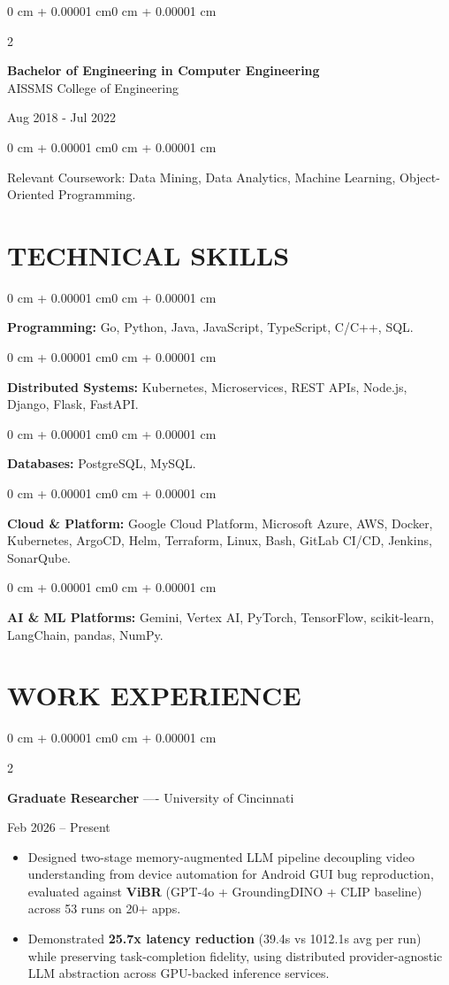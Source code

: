 \documentclass[10pt, letterpaper]{article}
\newenvironment{highlights}{
    \begin{itemize}[
        topsep=0.10 cm,
        parsep=0.06 cm,
        partopsep=0pt,
        itemsep=0.06 cm,
        leftmargin=12pt
    ]
}{
    \end{itemize}
}
\newenvironment{onecolentry}{
    \begin{adjustwidth}{0 cm + 0.00001 cm}{0 cm + 0.00001 cm}
}{
    \end{adjustwidth}
}
\newenvironment{twocolentry}[2][]{
    \onecolentry
    \def\secondColumn{#2}
    \setcolumnwidth{\fill, 4.5 cm}
    \begin{paracol}{2}
}{
    \switchcolumn \raggedleft \secondColumn
    \end{paracol}
    \endonecolentry
}
\begin{document}
\begin{twocolentry}{
    Aug 2018 - Jul 2022
}
    \textbf{Bachelor of Engineering in Computer Engineering} \\
    AISSMS College of Engineering
\end{twocolentry}
\begin{onecolentry}
Relevant Coursework: Data Mining, Data Analytics, Machine Learning, Object-Oriented Programming.
\end{onecolentry}
\section{TECHNICAL SKILLS}
\begin{onecolentry}
\textbf{Programming:} Go, Python, Java, JavaScript, TypeScript, C/C++, SQL.
\end{onecolentry}
\vspace{0.06 cm}
\begin{onecolentry}
\textbf{Distributed Systems:} Kubernetes, Microservices, REST APIs, Node.js, Django, Flask, FastAPI.
\end{onecolentry}
\vspace{0.06 cm}
\begin{onecolentry}
\textbf{Databases:} PostgreSQL, MySQL.
\end{onecolentry}
\vspace{0.06 cm}
\begin{onecolentry}
\textbf{Cloud \& Platform:} Google Cloud Platform, Microsoft Azure, AWS, Docker, Kubernetes, ArgoCD, Helm, Terraform, Linux, Bash, GitLab CI/CD, Jenkins, SonarQube.
\end{onecolentry}
\vspace{0.06 cm}
\begin{onecolentry}
\textbf{AI \& ML Platforms:} Gemini, Vertex AI, PyTorch, TensorFlow, scikit-learn, LangChain, pandas, NumPy.
\end{onecolentry}

\section{WORK EXPERIENCE}
\begin{twocolentry}{Feb 2026 -- Present}
\textbf{Graduate Researcher} ---- University of Cincinnati
\end{twocolentry}
\begin{highlights}
  \item Designed two-stage memory-augmented LLM pipeline decoupling video understanding from device automation for Android GUI bug reproduction, evaluated against \textbf{ViBR} (GPT-4o + GroundingDINO + CLIP baseline) across 53 runs on 20+ apps.
  \item Demonstrated \textbf{25.7x latency reduction} (39.4s vs 1012.1s avg per run) while preserving task-completion fidelity, using distributed provider-agnostic LLM abstraction across GPU-backed inference services.
\end{highlights}
\end{document}
